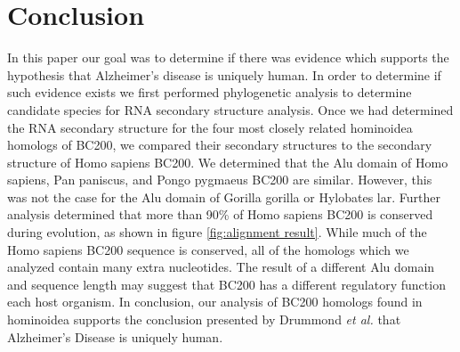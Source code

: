 \documentclass[conference, 11pt]{IEEEtran}
\begin{document}
\section{Conclusion}\label{sec:conclusion}

In this paper our goal was to determine if there was evidence which supports the hypothesis that Alzheimer’s disease is uniquely human. 
In order to determine if such evidence exists we first performed phylogenetic analysis to determine candidate species for RNA secondary structure analysis. 
Once we had determined the RNA secondary structure for the four most closely related hominoidea homologs of BC200, we compared their secondary structures to the secondary structure of Homo sapiens BC200. 
We determined that the Alu domain of Homo sapiens, Pan paniscus, and Pongo pygmaeus BC200 are similar. 
However, this was not the case for the Alu domain of Gorilla gorilla or Hylobates lar. 
Further analysis determined that more than 90\% of Homo sapiens BC200 is conserved during evolution, as shown in figure \ref{fig:alignment result}. 
While much of the Homo sapiens BC200 sequence is conserved, all of the homologs which we analyzed contain many extra nucleotides. 
The result of a different Alu domain and sequence length may suggest that BC200 has a different regulatory function each host organism. 
In conclusion, our analysis of BC200 homologs found in hominoidea supports the conclusion presented by Drummond \emph{et al.} that Alzheimer’s Disease is uniquely human.



\end{document}
